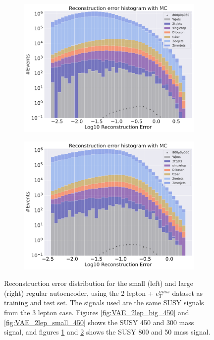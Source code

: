 \begin{figure}[H]
\begin{subfigure}{.45\textwidth}
        \includegraphics[width=\textwidth]{Figures/VAE_testing/big/2lep/b_data_recon_big_rm3_feats_sig_800p0p050_.pdf}
        \caption{}
        \label{fig:VAE_2lep_big_800}
    \end{subfigure}
    \hfill   
    \begin{subfigure}{.45\textwidth}
        \includegraphics[width=\textwidth]{Figures/VAE_testing/small/2lep/b_data_recon_big_rm3_feats_sig_800p0p050_.pdf}
        \caption{}
        \label{fig:VAE_2lep_small_800}
    \end{subfigure}
    \hfill      
    \caption[2lep reconstruction error with SUSY signals for VAE]{Reconstruction error distribution for the small (left) and large (right)
    regular autoencoder, using the 2 lepton + $e_T^{miss}$ dataset as training and test set. The signals used are the same SUSY signals 
    from the 3 lepton case. Figures \ref{fig:VAE_2lep_big_450} and \ref{fig:VAE_2lep_small_450} shows the SUSY 450 and 300 mass signal, 
    and figures \ref{fig:VAE_2lep_big_800} and \ref{fig:VAE_2lep_small_800} shows the SUSY 800 and 50 mass signal.}
    \label{fig:VAE_2lep_recon_err_both_sig}
\end{figure}

